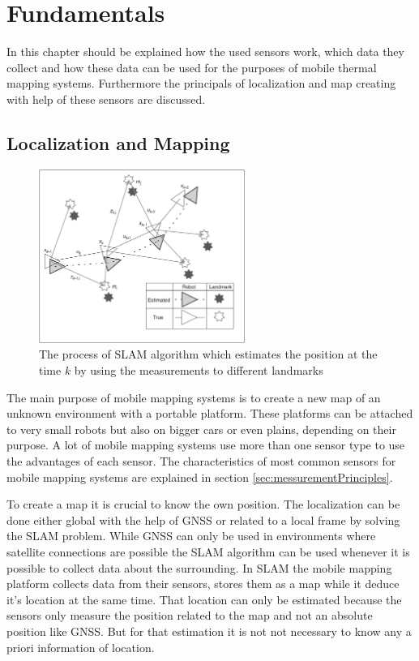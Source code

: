 \chapter{Fundamentals}\label{ch:fundamentals}
In this chapter should be explained how the used sensors work, which data they collect and how these data can be used for the purposes of mobile thermal mapping systems.
Furthermore the principals of localization and map creating with help of these sensors are discussed.

\section{Localization and Mapping}\label{sec:localizationAndMapping}

\begin{figure}
	\centering
	\includegraphics[width=0.60\textwidth]{img/fundamentals/slam.png}
	\caption{The process of SLAM algorithm which estimates the position at the time $k$ by using the measurements to different landmarks\cite{durrant-Whyte2006}}
	\label{fig:slam}
\end{figure}

The main purpose of mobile mapping systems is to create a new map of an unknown environment with a portable platform.
These platforms can be attached to very small robots but also on bigger cars or even plains, depending on their purpose.
A lot of mobile mapping systems use more than one sensor type to use the advantages of each sensor.
The characteristics of most common sensors for mobile mapping systems are explained in section \ref{sec:messurementPrinciples}.

To create a map it is crucial to know the own position.
The localization can be done either global with the help of \ac{GNSS} or related to a local frame by solving the \ac{SLAM} problem.
While \ac{GNSS} can only be used in environments where satellite connections are possible the \ac{SLAM} algorithm can be used whenever it is possible to collect data about the surrounding.
In \ac{SLAM} the mobile mapping platform collects data from their sensors, stores them as a map while it deduce it's location at the same time.
That location can only be estimated because the sensors only measure the position related to the map and not an absolute position like \ac{GNSS}.
But for that estimation it is not not necessary to know any a priori information of location\cite{durrant-Whyte2006}.

